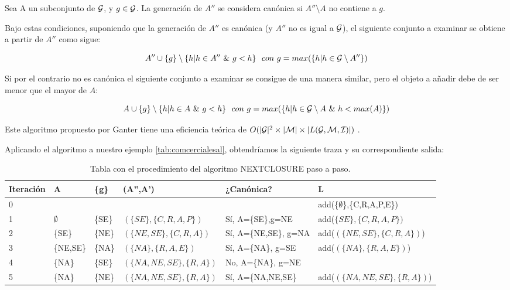 \documentclass[oneside,openright,titlepage,numbers=noenddot,openany,headinclude,footinclude=true,
cleardoublepage=empty,abstractoff,BCOR=5mm,paper=a4,fontsize=12pt,main=spanish]{scrreprt}
\begin{document}
\begin{definition}
Sea A un subconjunto de $\mathcal{G}$, y $g \in \mathcal{G}$. La generación de $A''$ se considera canónica si $A''\setminus A$ no contiene a $g$.
\end{definition}

 Bajo estas condiciones, suponiendo que la generación de $A''$ es canónica (y $A''$ no es igual a $\mathcal{G}$), el siguiente conjunto a examinar se obtiene a partir de $A''$ como sigue:

$$A''\cup \{g\} \setminus \{h | h \in A'' \ \& \ g < h\} \ \ con \ g=max(\{h | h\in \mathcal{G} \setminus A''\})$$

Si por el contrario no es canónica el siguiente conjunto a examinar se consigue de una manera similar, pero el objeto a añadir debe de ser menor que el mayor de $A$:

$$A\cup \{g\} \setminus \{h | h \in A \  \& \ g < h\} \ \ con \ g=max(\{h | h\in \G \setminus A \ \& \ h < max(A)\})$$

Este algoritmo propuesto por Ganter tiene una eficiencia teórica de $O(|\mathcal{G}|^2 \times |\mathcal{M}| \times |L(\mathcal{G},\mathcal{M},\mathcal{I})|)$ \cite{comparingperformance}.

Aplicando el algoritmo a nuestro ejemplo \ref{tab:comcercialesal}, obtendríamos la siguiente traza y su correspondiente salida:

\begin{table}[H]

\resizebox{16.0cm}{!} {
\begin{tabular}{|l|l|l|l|l|l|}
\hline
\textbf{Iteración} & \textbf{A}  & \textbf{\{g\}} & \textbf{(A'',A')}        & \textbf{¿Canónica?}       & \textbf{L}                                        \\ \hline
0                  &             &                &                          &                           & add(\{$\emptyset$\},\{C,R,A,P,E\}) \\
1                  & $\emptyset$ & \{SE\}         & $(\{SE\},\{C,R,A,P\})$   & Sí, A=\{SE\},g=NE     & add($\{SE\},\{C,R,A,P\})$                         \\
2                  & \{SE\}      & \{NE\}         & $(\{NE,SE\},\{C,R,A\})$  & Sí, A=\{NE,SE\}, g=NA & add($(\{NE,SE\},\{C,R,A\})$)                      \\
3                  & \{NE,SE\}   & \{NA\}         & $(\{NA\},\{R,A,E\})$     & Sí, A=\{NA\}, g=SE    & add($(\{NA\},\{R,A,E\})$)                         \\
4                  & \{NA\}      & \{SE\}         & $(\{NA,NE,SE\},\{R,A\})$ & No, A=\{NA\}, g=NE    &                                                   \\
5                  & \{NA\}      & \{NE\}         & $(\{NA,NE,SE\},\{R,A\})$ & Sí, A=\{NA,NE,SE\}        & add($(\{NA,NE,SE\},\{R,A\})$)                     \\ \hline
\end{tabular}
}
\caption{Tabla con el procedimiento del algoritmo NEXTCLOSURE paso a paso.}
\label{tab:my-table}
\end{table}
\end{document}
